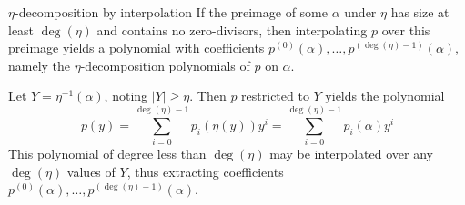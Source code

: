 \begin{theorem}{$\eta$-decomposition by interpolation}
    If the preimage of some $\alpha$ under $\eta$ has size at least $\deg(\eta)$ and contains no zero-divisors, then interpolating $p$ over this preimage yields a polynomial with coefficients $p^{(0)}(\alpha),\dots,p^{(\deg(\eta)-1)}(\alpha)$, namely the $\eta$-decomposition polynomials of $p$ on $\alpha$.

    \proof
    Let $Y = \eta^{-1}(\alpha)$, noting $|Y|\geq\eta$.
    Then $p$ restricted to $Y$ yields the polynomial
    \begin{equation}
        p(y) = \sum_{i=0}^{\deg(\eta)-1} p_i(\eta(y))y^i
        = \sum_{i=0}^{\deg(\eta)-1} p_i(\alpha)y^i
    \end{equation}
    This polynomial of degree less than $\deg(\eta)$ may be interpolated over any $\deg(\eta)$ values of $Y$, thus extracting coefficients $p^{(0)}(\alpha),\dots,p^{(\deg(\eta)-1)}(\alpha)$.
\end{theorem}
